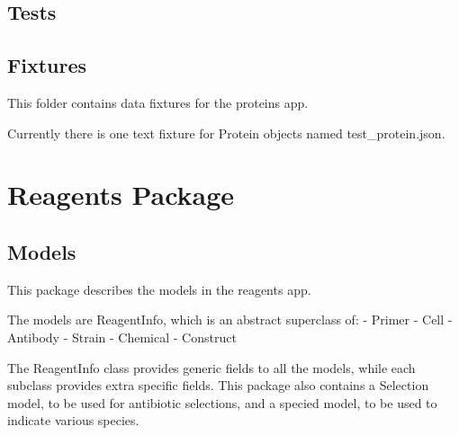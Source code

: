 \documentclass[letterpaper,10pt,english]{sphinxmanual}
\begin{document}
\subsection{Tests}
\label{api:id20}

\subsection{Fixtures}
\label{api:id21}\label{api:module-experimentdb.proteins.fixtures}
This folder contains data fixtures for the proteins app.


Currently there is one text fixture for Protein objects named test\_protein.json.



\section{Reagents Package}
\label{api:module-experimentdb.reagents}\label{api:reagents-package}

\subsection{Models}
\label{api:id22}\label{api:module-experimentdb.reagents.models}
This package describes the models in the reagents app.


The models are ReagentInfo, which is an abstract superclass of:
- Primer
- Cell
- Antibody
- Strain
- Chemical
- Construct


The ReagentInfo class provides generic fields to all the models, while each subclass provides extra specific fields.
This package also contains a Selection model, to be used for antibiotic selections, and a specied model, to be used to indicate various species.

\end{document}
